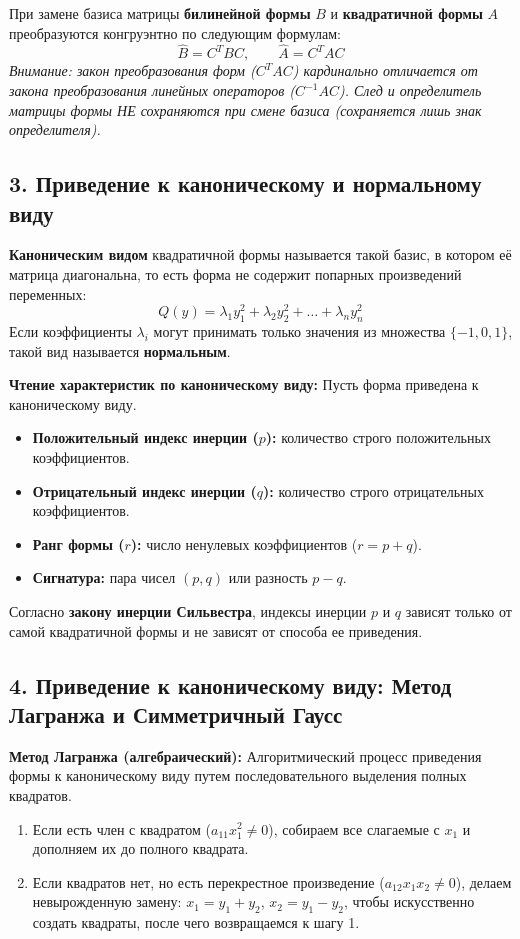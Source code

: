При замене базиса матрицы \textbf{билинейной формы} $B$ и \textbf{квадратичной формы} $A$ преобразуются конгруэнтно по следующим формулам:
\[
\hat{B} = C^T B C, \qquad \hat{A} = C^T A C
\]
\textit{Внимание: закон преобразования форм ($C^T A C$) кардинально отличается от закона преобразования линейных операторов ($C^{-1} A C$). След и определитель матрицы формы НЕ сохраняются при смене базиса (сохраняется лишь знак определителя).}

\subsection*{3. Приведение к каноническому и нормальному виду}

\begin{definition}
\textbf{Каноническим видом} квадратичной формы называется такой базис, в котором её матрица диагональна, то есть форма не содержит попарных произведений переменных:
\[
Q(y) = \lambda_1 y_1^2 + \lambda_2 y_2^2 + \dots + \lambda_n y_n^2
\]
Если коэффициенты $\lambda_i$ могут принимать только значения из множества $\{-1, 0, 1\}$, такой вид называется \textbf{нормальным}.
\end{definition}

\textbf{Чтение характеристик по каноническому виду:}
Пусть форма приведена к каноническому виду.
\begin{itemize}
    \item \textbf{Положительный индекс инерции ($p$):} количество строго положительных коэффициентов.
    \item \textbf{Отрицательный индекс инерции ($q$):} количество строго отрицательных коэффициентов.
    \item \textbf{Ранг формы ($r$):} число ненулевых коэффициентов ($r = p + q$).
    \item \textbf{Сигнатура:} пара чисел $(p, q)$ или разность $p - q$.
\end{itemize}
Согласно \textbf{закону инерции Сильвестра}, индексы инерции $p$ и $q$ зависят только от самой квадратичной формы и не зависят от способа ее приведения.

\subsection*{4. Приведение к каноническому виду: Метод Лагранжа и Симметричный Гаусс}

\textbf{Метод Лагранжа (алгебраический):} 
Алгоритмический процесс приведения формы к каноническому виду путем последовательного выделения полных квадратов.
\begin{enumerate}
    \item Если есть член с квадратом ($a_{11} x_1^2 \neq 0$), собираем все слагаемые с $x_1$ и дополняем их до полного квадрата.
    \item Если квадратов нет, но есть перекрестное произведение ($a_{12} x_1 x_2 \neq 0$), делаем невырожденную замену: $x_1 = y_1 + y_2$, $x_2 = y_1 - y_2$, чтобы искусственно создать квадраты, после чего возвращаемся к шагу 1.
\end{enumerate}

